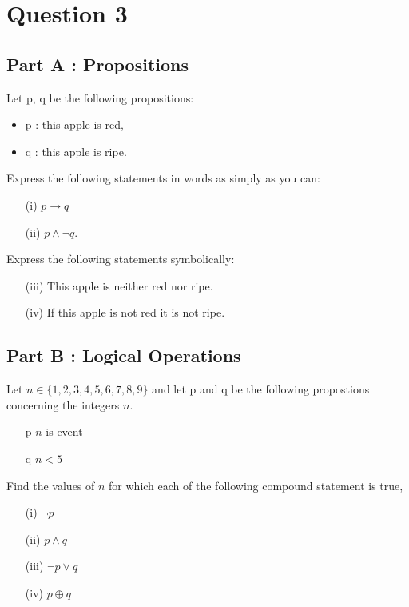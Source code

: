 \documentclass[]{report}
\begin{document}
\newpage



\section*{Question 3}
\subsection*{Part A : Propositions}
Let p, q be the following propositions:
\begin{itemize}
	\item p : this apple is red, 
	\item q : this apple is ripe.
\end{itemize}

\noindent Express the following statements in words as simply as you can:
\begin{itemize}
	\item[(i)] $p \rightarrow q$
	\item[(ii)] $p \wedge \neg q$.
\end{itemize}

\noindent Express the following statements symbolically:
\begin{itemize}
	\item[(iii)] This apple is neither red nor ripe.
	\item[(iv)] If this apple is not red it is not ripe.
\end{itemize}

\subsection*{Part B : Logical Operations}
Let $n \in \{1,2,3,4,5,6,7,8,9\}$ and let p and q be the following propostions concerning 
the integers $n$.

\begin{itemize}
	\item[p] $n$ is event
	\item[q] $n<5$
\end{itemize}

Find the values of $n$ for which each of the following compound statement is true,

\begin{itemize}
	\item[(i)] $\neg p$
	\item[(ii)] $p \wedge q$
	\item[(iii)] $\neg p \vee q$ 
	\item[(iv)] $p \oplus q$
\end{itemize}
\end{document}
